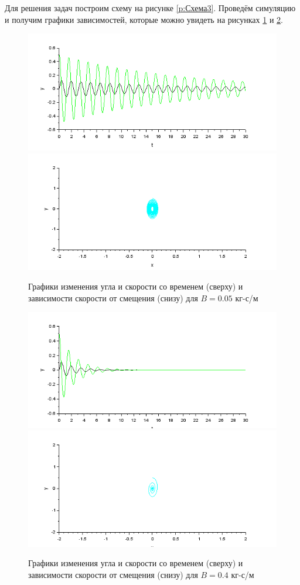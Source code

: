 \documentclass[a4paper, 12pt]{article}
\begin{document}
Для решения задач построим схему на рисунке \ref{p:Схема3}. Проведём симуляцию и получим графики зависимостей, которые можно увидеть на рисунках \ref{p:Графики2-1} и \ref{p:Графики2-2}.

\begin{figure}[h!]
	\centering
	\includegraphics[scale=0.8]{graph2-1}
	\includegraphics[scale=0.8]{graph2-2}
	\caption{Графики изменения угла и скорости со временем (сверху) и зависимости скорости от смещения (снизу) для $B = 0.05$ кг-с/м }
	\label{p:Графики2-1}
\end{figure}

\begin{figure}[h!]
	\centering
	\includegraphics[scale=0.8]{graph2-3}
	\includegraphics[scale=0.8]{graph2-4}
	\caption{Графики изменения угла и скорости со временем (сверху) и зависимости скорости от смещения (снизу) для $B = 0.4$ кг-с/м  }
	\label{p:Графики2-2}
\end{figure}
\end{document}
